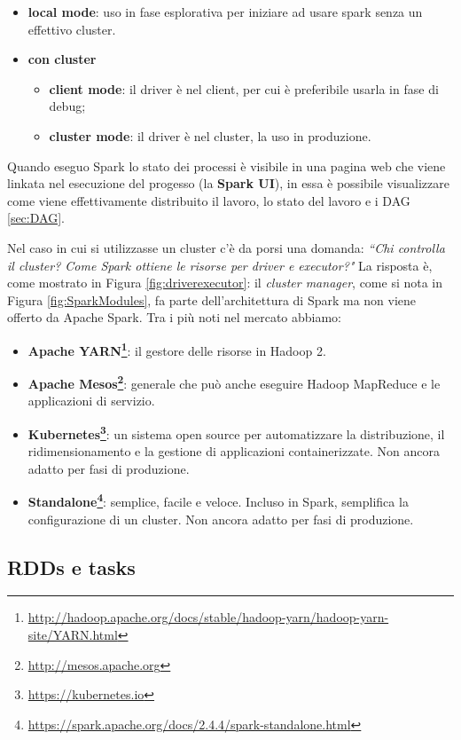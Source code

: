 \documentclass[12pt,italian]{article}
\begin{document}
\begin{itemize}
	\item \textbf{local mode}: uso in fase esplorativa per iniziare ad usare spark senza un effettivo cluster.
	\item \textbf{con cluster}
	\begin{itemize}
		\item \textbf{client mode}: il driver è nel client, per cui è preferibile usarla in fase di debug;
		\item \textbf{cluster mode}: il driver è nel cluster, la uso in produzione.
	\end{itemize}
\end{itemize}
Quando eseguo Spark lo stato dei processi è visibile in una pagina web che viene linkata nel esecuzione del progesso (la \textbf{Spark UI}), in essa è possibile visualizzare come viene effettivamente distribuito il lavoro, lo stato del lavoro e i DAG \ref{sec:DAG}. 

\par Nel caso in cui si utilizzasse un cluster c'è da porsi una domanda: \textit{``Chi controlla il cluster? Come Spark ottiene le risorse per driver e executor?"}
\newline La risposta è, come mostrato in Figura \ref{fig:driverexecutor}: il \textit{cluster manager}, come si nota in Figura \ref{fig:SparkModules}, fa parte dell'architettura di Spark ma non viene offerto da Apache Spark. Tra i più noti nel mercato abbiamo:
\begin{itemize}
	\item\textbf{Apache YARN\footnote{\url{http://hadoop.apache.org/docs/stable/hadoop-yarn/hadoop-yarn-site/YARN.html}}}: il gestore delle risorse in Hadoop 2.
	\item\textbf{Apache Mesos\footnote{\url{http://mesos.apache.org}}}: generale che può anche eseguire Hadoop MapReduce e le applicazioni di servizio.
	\item\textbf{Kubernetes\footnote{\url{https://kubernetes.io}}}: un sistema open source per automatizzare la distribuzione, il ridimensionamento e la gestione di applicazioni containerizzate. Non ancora adatto per fasi di produzione.
	\item\textbf{Standalone\footnote{\url{https://spark.apache.org/docs/2.4.4/spark-standalone.html}}}: semplice, facile e veloce. Incluso in Spark, semplifica la configurazione di un cluster. Non ancora adatto per fasi di produzione. 
\end{itemize}

\subsection{RDDs  e tasks}
\end{document}
